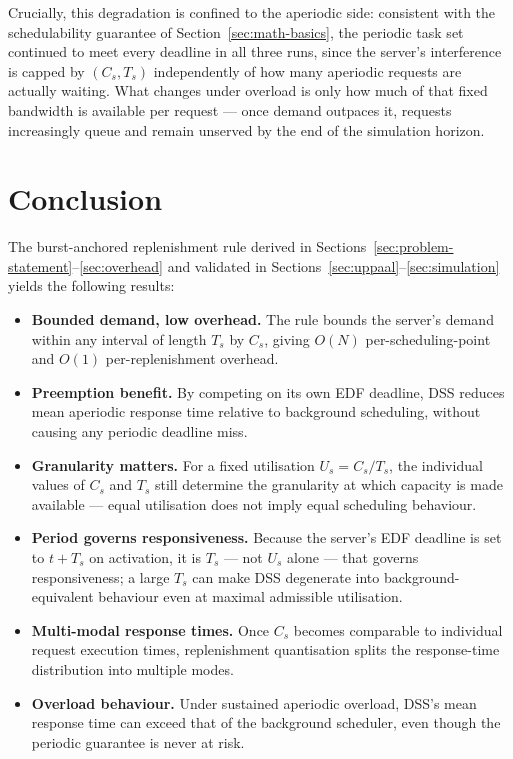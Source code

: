 \documentclass[conference]{IEEEtran}
\begin{document}
Crucially, this degradation is confined to the aperiodic side: consistent with the schedulability guarantee of Section~\ref{sec:math-basics}, the periodic task set continued to meet every deadline in all three runs, since the server's interference is capped by $(C_s, T_s)$ independently of how many aperiodic requests are actually waiting. What changes under overload is only how much of that fixed bandwidth is available per request — once demand outpaces it, requests increasingly queue and remain unserved by the end of the simulation horizon.

    \section{Conclusion}
    \label{sec:conclusion}

    The burst-anchored replenishment rule derived in Sections~\ref{sec:problem-statement}--\ref{sec:overhead} and validated in Sections~\ref{sec:uppaal}--\ref{sec:simulation} yields the following results:

    \begin{itemize}
        \item \textbf{Bounded demand, low overhead.} The rule bounds the server's demand within any interval of length $T_s$ by $C_s$, giving $O(N)$ per-scheduling-point and $O(1)$ per-replenishment overhead.
        \item \textbf{Preemption benefit.} By competing on its own EDF deadline, DSS reduces mean aperiodic response time relative to background scheduling, without causing any periodic deadline miss.
        \item \textbf{Granularity matters.} For a fixed utilisation $U_s=C_s/T_s$, the individual values of $C_s$ and $T_s$ still determine the granularity at which capacity is made available — equal utilisation does not imply equal scheduling behaviour.
        \item \textbf{Period governs responsiveness.} Because the server's EDF deadline is set to $t+T_s$ on activation, it is $T_s$ — not $U_s$ alone — that governs responsiveness; a large $T_s$ can make DSS degenerate into background-equivalent behaviour even at maximal admissible utilisation.
        \item \textbf{Multi-modal response times.} Once $C_s$ becomes comparable to individual request execution times, replenishment quantisation splits the response-time distribution into multiple modes.
        \item \textbf{Overload behaviour.} Under sustained aperiodic overload, DSS's mean response time can exceed that of the background scheduler, even though the periodic guarantee is never at risk.
    \end{itemize}
\end{document}
